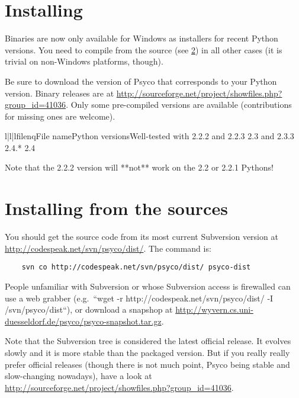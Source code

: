 \documentclass{manual}
\begin{document}
\section{Installing}\label{binaries}

Binaries are now only available for Windows as installers for recent Python versions.  You need to compile from the source (see \ref{sources}) in all other cases (it is trivial on non-Windows platforms, though).

Be sure to download the version of Psyco that corresponds to your Python version.  Binary releases are at \url{http://sourceforge.net/project/showfiles.php?group_id=41036}.  Only some pre-compiled versions are available (contributions for missing ones are welcome).

\begin{tableiii}{l|l|l}{filenq}{File name}{Python versions}{Well-tested with}
     {2.2.2 and 2.2.3}
       {2.3 and 2.3.3}
       {2.4.*}
       {2.4}
\end{tableiii}

Note that the 2.2.2 version will **not** work on the 2.2 or 2.2.1 Pythons!


\section{Installing from the sources}\label{sources}

You should get the source code from its most current Subversion version at \url{http://codespeak.net/svn/psyco/dist/}.  The command is:
        
\begin{verbatim}
    svn co http://codespeak.net/svn/psyco/dist/ psyco-dist
\end{verbatim}

People unfamiliar with Subversion or whose Subversion access is firewalled can use a web grabber (e.g.\ ``wget -r http://codespeak.net/svn/psyco/dist/ -I /svn/psyco/dist``), or download a snapshop at \url{http://wyvern.cs.uni-duesseldorf.de/psyco/psyco-snapshot.tar.gz}.

Note that the Subversion tree is considered the latest official release.  It evolves slowly and it is more stable than the packaged version.  But if you really really prefer official releases (though there is not much point, Psyco being stable and slow-changing nowadays), have a look at \url{http://sourceforge.net/project/showfiles.php?group_id=41036}.
\end{document}
